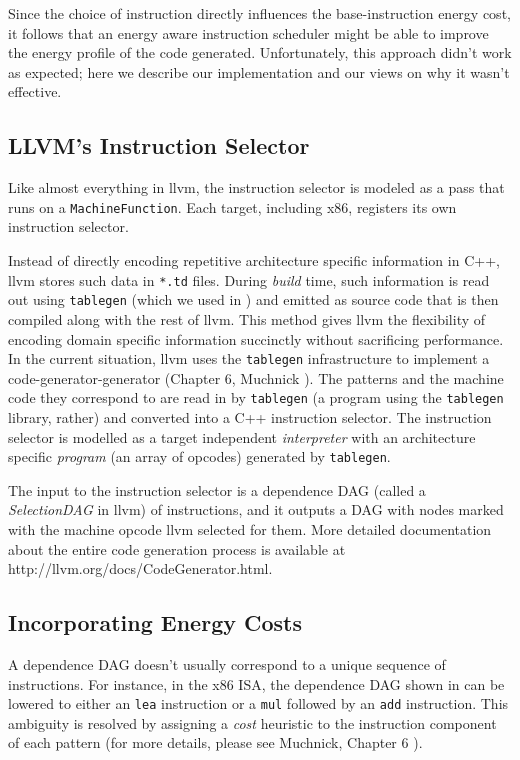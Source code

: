 Since the choice of instruction directly influences the
base-instruction energy cost, it follows that an energy aware
instruction scheduler might be able to improve the energy profile of
the code generated.  Unfortunately, this approach didn't work as
expected; here we describe our implementation and our views on why it
wasn't effective.

\subsection{LLVM's Instruction Selector}

Like almost everything in llvm, the instruction selector is modeled as
a pass that runs on a \texttt{MachineFunction}.  Each target,
including x86, registers its own instruction selector.

Instead of directly encoding repetitive architecture specific
information in C++, llvm stores such data in \texttt{*.td}
files. During \textit{build} time, such information is read out using
\texttt{tablegen} (which we used in ) and
emitted as source code that is then compiled along with the rest of
llvm. This method gives llvm the flexibility of encoding domain
specific information succinctly without sacrificing performance.  In
the current situation, llvm uses the \texttt{tablegen} infrastructure
to implement a code-generator-generator (Chapter 6, Muchnick
\cite{muchnick}). The patterns and the machine code they correspond to
are read in by \texttt{tablegen} (a program using the
\texttt{tablegen} library, rather) and converted into a C++
instruction selector.  The instruction selector is modelled as a
target independent \textit{interpreter} with an architecture specific
\textit{program} (an array of opcodes) generated by \texttt{tablegen}.

The input to the instruction selector is a dependence DAG (called a
\textit{SelectionDAG} in llvm) of instructions, and it outputs a DAG
with nodes marked with the machine opcode llvm selected for them.
More detailed documentation about the entire code generation process
is available at http://llvm.org/docs/CodeGenerator.html.

\subsection{Incorporating Energy Costs}

A dependence DAG doesn't usually correspond to a unique sequence of
instructions.  For instance, in the x86 ISA, the dependence DAG shown
in  can be lowered to either an \texttt{lea}
instruction or a \texttt{mul} followed by an \texttt{add} instruction.
This ambiguity is resolved by assigning a \textit{cost} heuristic to
the instruction component of each pattern (for more details, please
see Muchnick, Chapter 6 \cite{muchnick}).

